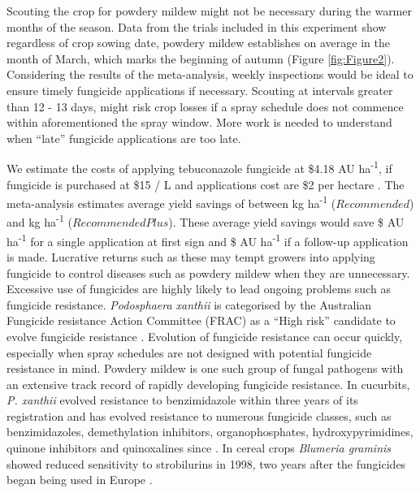 \documentclass[agronomy,article,submit,moreauthors,pdftex]{mdpi}
\begin{document}
Scouting the crop for powdery mildew might not be necessary during the warmer months of the season.
Data from the trials included in this experiment show regardless of crop sowing date, powdery mildew establishes on average in the month of March, which marks the beginning of autumn (Figure \ref{fig:Figure2}).
Considering the results of the meta-analysis, weekly inspections would be ideal to ensure timely fungicide applications if necessary.
Scouting at intervals greater than 12 - 13 days, might risk crop losses if a spray schedule does not commence within aforementioned the spray window.
More work is needed to understand when ``late'' fungicide applications are too late.

We estimate the costs of applying tebuconazole fungicide at \$4.18 AU ha\textsuperscript{-1}, if fungicide is purchased at \$15 / L \citep{Simfendorfer2011} and applications cost are \$2 per hectare \citep{QueenslandGovernment2019}.
The meta-analysis estimates average yield savings of between kg ha\textsuperscript{-1} (\(Recommended\)) and kg ha\textsuperscript{-1} (\(RecommendedPlus\)).
These average yield savings would save \$ AU ha\textsuperscript{-1} for a single application at first sign and \$ AU ha\textsuperscript{-1} if a follow-up application is made.
Lucrative returns such as these may tempt growers into applying fungicide to control diseases such as powdery mildew when they are unnecessary.
Excessive use of fungicides are highly likely to lead ongoing problems such as fungicide resistance.
\emph{Podosphaera xanthii} is categorised by the Australian Fungicide resistance Action Committee (FRAC) as a ``High risk'' candidate to evolve fungicide resistance \citep{FRACrisk2019}.
Evolution of fungicide resistance can occur quickly, especially when spray schedules are not designed with potential fungicide resistance in mind.
Powdery mildew is one such group of fungal pathogens with an extensive track record of rapidly developing fungicide resistance.
In cucurbits, \emph{P. xanthii} evolved resistance to benzimidazole within three years of its registration \citep{Peterson1973} and has evolved resistance to numerous fungicide classes, such as benzimidazoles, demethylation inhibitors, organophosphates, hydroxypyrimidines, quinone inhibitors and quinoxalines since \citep{Mcgrath2001}.
In cereal crops \emph{Blumeria graminis} showed reduced sensitivity to strobilurins in 1998, two years after the fungicides began being used in Europe \citep{Chin2001}.
\end{document}
